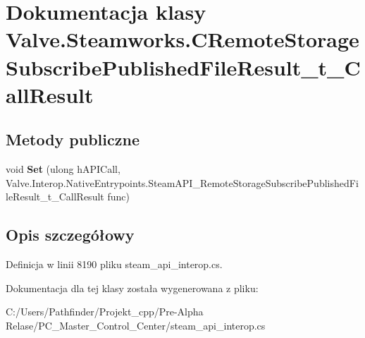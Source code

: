 \hypertarget{class_valve_1_1_steamworks_1_1_c_remote_storage_subscribe_published_file_result__t___call_result}{}\section{Dokumentacja klasy Valve.\+Steamworks.\+C\+Remote\+Storage\+Subscribe\+Published\+File\+Result\+\_\+t\+\_\+\+Call\+Result}
\label{class_valve_1_1_steamworks_1_1_c_remote_storage_subscribe_published_file_result__t___call_result}
\subsection*{Metody publiczne}
\begin{DoxyCompactItemize}
\item 
\mbox{\label{class_valve_1_1_steamworks_1_1_c_remote_storage_subscribe_published_file_result__t___call_result_a82e24ea91065754b035feb43e5f7380a}} 
void {\bfseries Set} (ulong h\+A\+P\+I\+Call, Valve.\+Interop.\+Native\+Entrypoints.\+Steam\+A\+P\+I\+\_\+\+Remote\+Storage\+Subscribe\+Published\+File\+Result\+\_\+t\+\_\+\+Call\+Result func)
\end{DoxyCompactItemize}


\subsection{Opis szczegółowy}


Definicja w linii 8190 pliku steam\+\_\+api\+\_\+interop.\+cs.



Dokumentacja dla tej klasy została wygenerowana z pliku\+:\begin{DoxyCompactItemize}
\item 
C\+:/\+Users/\+Pathfinder/\+Projekt\+\_\+cpp/\+Pre-\/\+Alpha Relase/\+P\+C\+\_\+\+Master\+\_\+\+Control\+\_\+\+Center/steam\+\_\+api\+\_\+interop.\+cs\end{DoxyCompactItemize}
